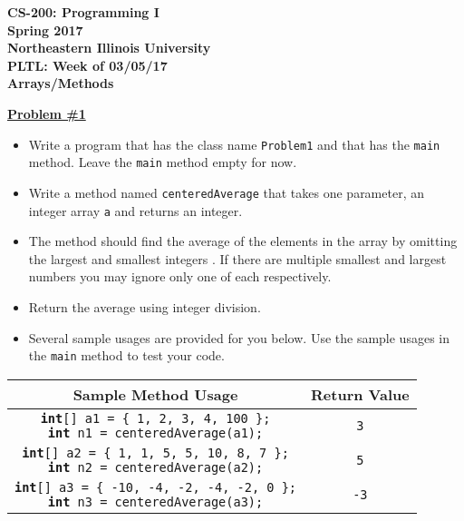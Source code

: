 \documentclass[12pt]{article}
\begin{document}
\begin{center}
	\textbf{CS-200: Programming I}\\
	\textbf{Spring 2017}\\
	\textbf{Northeastern Illinois University}\\
	\textbf{PLTL: Week of 03/05/17}\\
	\textbf{Arrays/Methods}
\end{center}


\noindent\underline{\textbf{Problem \#1}}
\begin{itemize}
	\item Write a program that has the class name \texttt{Problem1} and that has the \texttt{main} method. Leave the \texttt{main} method empty for now.
	\item Write a method named \texttt{centeredAverage} that takes one parameter, an integer array \texttt{a} and returns an integer.
	\item The method should find the average of the elements in the array by omitting the largest and smallest integers . If there are multiple smallest and largest numbers you may ignore only one of each respectively.
	\item Return the average using integer division.
	\item Several sample usages are provided for you below. Use the sample usages in the \texttt{main} method to test your code.
\end{itemize}
\begin{center}
\small
\begin{tabular}{| c | c |}
\hline\rule{0pt}{4ex}
Sample Method Usage & Return Value \\
\hline\rule{0pt}{5ex}
\makecell[l]{\texttt{\textbf{int}[] a1 = \{ 1, 2, 3, 4, 100 \};} \\ \texttt{\textbf{int} n1 = centeredAverage(a1);}} & \texttt{3}\\
\hline\rule{0pt}{5ex}
\makecell[l]{\texttt{\textbf{int}[] a2 = \{ 1, 1, 5, 5, 10, 8, 7 \};} \\ \texttt{\textbf{int} n2 = centeredAverage(a2);}} & \texttt{5}\\
\hline\rule{0pt}{5ex}
\makecell[l]{\texttt{\textbf{int}[] a3 = \{ -10, -4, -2, -4, -2, 0 \};} \\ \texttt{\textbf{int} n3 = centeredAverage(a3);}} & \texttt{-3}\\
\hline
\end{tabular}
\end{center}
\end{document}
